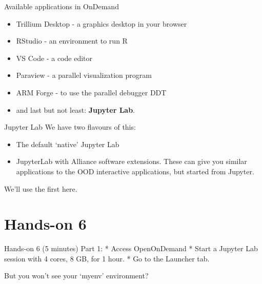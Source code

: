 \documentclass[
  10pt,
  ignorenonframetext,
  aspectratio=169]{beamer}
\begin{document}
\begin{frame}{Available applications in OnDemand}
\label{available-applications-in-ondemand}
\begin{itemize}
\item
  Trillium Desktop - a graphics desktop in your browser

  \pause
\item
  RStudio - an environment to run R

  \pause
\item
  VS Code - a code editor

  \pause
\item
  Paraview - a parallel visualization program

  \pause
\item
  ARM Forge - to use the parallel debugger DDT

  \pause
\item
  and last but not least: \textbf{Jupyter Lab}.
\end{itemize}
\end{frame}

\begin{frame}{Jupyter Lab}
\label{jupyter-lab}
We have two flavours of this:

\begin{itemize}
\item
  The default `native' Jupyter Lab
\item
  JupyterLab with Alliance software extensions. These can give you similar applications to the OOD interactive applications, but started from Jupyter.
\end{itemize}

We'll use the first here.
\end{frame}

\section{Hands-on 6}\label{hands-on-6}

\begin{frame}{Hands-on 6 (5 minutes)}
\label{hands-on-6-5-minutes}
Part 1: * Access OpenOnDemand * Start a Jupyter Lab session with 4 cores, 8 GB, for 1 hour. * Go to the Launcher tab.

But you won't see your `myenv' environment?
\end{frame}
\end{document}
